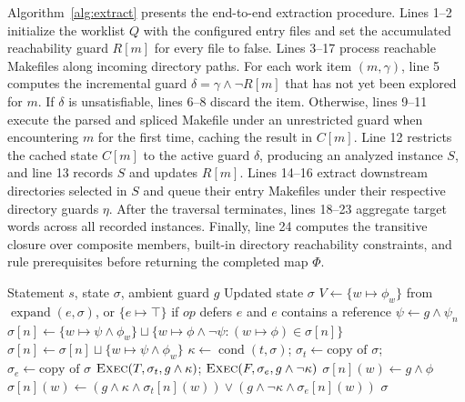 \documentclass[acmsmall]{acmart}
\begin{document}
Algorithm~\ref{alg:extract} presents the end-to-end extraction procedure.
Lines 1--2 initialize the worklist $Q$ with the configured entry files and set the accumulated reachability guard $R[m]$ for every file to false.
Lines 3--17 process reachable Makefiles along incoming directory paths.
For each work item $(m, \gamma)$, line 5 computes the incremental guard $\delta = \gamma \land \neg R[m]$ that has not yet been explored for $m$.
If $\delta$ is unsatisfiable, lines 6--8 discard the item.
Otherwise, lines 9--11 execute the parsed and spliced Makefile under an unrestricted guard when encountering $m$ for the first time, caching the result in $C[m]$.
Line 12 restricts the cached state $C[m]$ to the active guard $\delta$, producing an analyzed instance $S$, and line 13 records $S$ and updates $R[m]$.
Lines 14--16 extract downstream directories selected in $S$ and queue their entry Makefiles under their respective directory guards $\eta$.
After the traversal terminates, lines 18--23 aggregate target words across all recorded instances.
Finally, line 24 computes the transitive closure over composite members, built-in directory reachability constraints, and rule prerequisites before returning the completed map $\Phi$.

\begin{algorithm}[t]
\caption{\textsc{Exec}: execute one statement over guarded words}
\label{alg:exec}
\begin{algorithmic}[1]
\Require Statement $s$, state $\sigma$, ambient guard $g$
\Ensure Updated state $\sigma$
  \State $V \gets \{w \mapsto \phi_w\}$ from $\operatorname{expand}(e, \sigma)$, or $\{e \mapsto \top\}$ if $\mathit{op}$ defers $e$ and $e$ contains a reference
    \State $\psi \gets g \land \psi_n$
      \State $\sigma[n] \gets \{w \mapsto \psi \land \phi_w\} \sqcup \{w \mapsto \phi \land \neg\psi : (w \mapsto \phi) \in \sigma[n]\}$
    \Else {}
      \State $\sigma[n] \gets \sigma[n] \sqcup \{w \mapsto \psi \land \phi_w\}$
    \EndIf
  \EndFor
{}
  \State $\kappa \gets \operatorname{cond}(t, \sigma)$; $\sigma_t \gets \text{copy of } \sigma$; $\sigma_e \gets \text{copy of } \sigma$
  \State $\textsc{Exec}(T, \sigma_t, g \land \kappa)$; $\textsc{Exec}(F, \sigma_e, g \land \neg\kappa)$
      \State $\sigma[n](w) \gets g \land \phi$ 
    \Else
      \State $\sigma[n](w) \gets (g \land \kappa \land \sigma_t[n](w)) \lor (g \land \neg\kappa \land \sigma_e[n](w))$
    \EndIf
  \EndFor
\EndIf
\State \Return $\sigma$
\end{algorithmic}
\end{algorithm}
\end{document}
